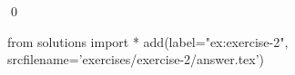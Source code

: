 
\begin{ex} 
  \label{ex:exercise-2}
  
  \qed
\end{ex} 
\begin{python0}
from solutions import *
add(label="ex:exercise-2",
    srcfilename='exercises/exercise-2/answer.tex') 
\end{python0}
